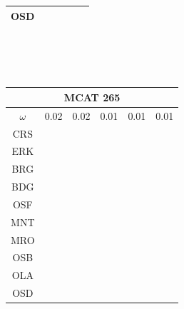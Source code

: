 \documentclass[12pt]{article}
\begin{document}
\begin{landscape}
\begin{figure}
\begin{minipage}[c]{0.3\textwidth}
\begin{tabular}{|c|c|c|c|c|c|}
        OSD&\cellcolor[HTML]{FF7F00}&\cellcolor[HTML]{FF7F00}&\cellcolor[HTML]{FF7F00}&\cellcolor[HTML]{984EA3}&\cellcolor[HTML]{FFFF33}\\ \hline %
\end{tabular}\\$~$\\$~$\\
\hspace*{-5cm}
\begin{tabular}{|c|c|c|c|c|c|}%
         \hline \multicolumn{6}{|c|}{MCAT 265} \\ \hline
         $\omega$&0.02&0.02&0.01&0.01&0.01 \\ \hline %
        CRS&\cellcolor[HTML]{E41A1C}&\cellcolor[HTML]{E41A1C}&\cellcolor[HTML]{E41A1C}&\cellcolor[HTML]{E41A1C}&\cellcolor[HTML]{E41A1C}\\ \hline %
        ERK&\cellcolor[HTML]{E41A1C}&\cellcolor[HTML]{E41A1C}&\cellcolor[HTML]{377EB8}&\cellcolor[HTML]{E41A1C}&\cellcolor[HTML]{E41A1C}\\ \hline %
        BRG&\cellcolor[HTML]{377EB8}&\cellcolor[HTML]{377EB8}&\cellcolor[HTML]{377EB8}&\cellcolor[HTML]{E41A1C}&\cellcolor[HTML]{E41A1C}\\ \hline %
        BDG&\cellcolor[HTML]{377EB8}&\cellcolor[HTML]{377EB8}&\cellcolor[HTML]{377EB8}&\cellcolor[HTML]{377EB8}&\cellcolor[HTML]{377EB8}\\ \hline %
        OSF&\cellcolor[HTML]{377EB8}&\cellcolor[HTML]{377EB8}&\cellcolor[HTML]{4DAF4A}&\cellcolor[HTML]{4DAF4A}&\cellcolor[HTML]{377EB8}\\ \hline %
        MNT&\cellcolor[HTML]{4DAF4A}&\cellcolor[HTML]{4DAF4A}&\cellcolor[HTML]{984EA3}&\cellcolor[HTML]{984EA3}&\cellcolor[HTML]{4DAF4A}\\ \hline %
        MRO&\cellcolor[HTML]{4DAF4A}&\cellcolor[HTML]{4DAF4A}&\cellcolor[HTML]{FF7F00}&\cellcolor[HTML]{FF7F00}&\cellcolor[HTML]{4DAF4A}\\ \hline %
        OSB&\cellcolor[HTML]{984EA3}&\cellcolor[HTML]{984EA3}&\cellcolor[HTML]{FF7F00}&\cellcolor[HTML]{FF7F00}&\cellcolor[HTML]{4DAF4A}\\ \hline %
        OLA&\cellcolor[HTML]{984EA3}&\cellcolor[HTML]{FF7F00}&\cellcolor[HTML]{FFFF33}&\cellcolor[HTML]{FFFF33}&\cellcolor[HTML]{984EA3}\\ \hline %
        OSD&\cellcolor[HTML]{FF7F00}&\cellcolor[HTML]{FF7F00}&\cellcolor[HTML]{FFFF33}&\cellcolor[HTML]{FFFF33}&\cellcolor[HTML]{FF7F00}\\ \hline %

\end{tabular}
\end{minipage}
\end{figure}
\end{landscape}
\end{document}
